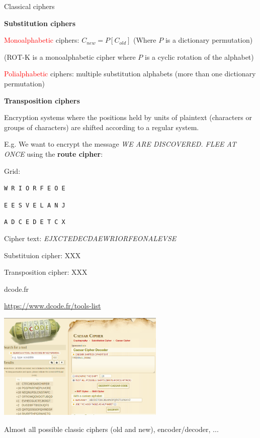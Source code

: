 \begin{frame}{Classical ciphers}

\textbf{Substitution ciphers}

\textcolor{red}{Monoalphabetic} ciphers: $C_{new} = P[C_{old}]$ (Where $P$ is a dictionary permutation)

\smallskip

(ROT-K is a monoalphabetic cipher where $P$ is a cyclic rotation of the alphabet)

\smallskip

\textcolor{red}{Polialphabetic} ciphers: multiple substitution alphabets (more than one dictionary permutation)

\smallskip

\textbf{Transposition ciphers}

Encryption systems where the positions held by units of plaintext (characters or groups of characters) are shifted according to a regular system.

\smallskip

E.g. We want to encrypt the message \textit{WE ARE DISCOVERED. FLEE AT ONCE} using the \textbf{route cipher}:

Grid: 

\centerline{\texttt{W R I O R F E O E}}
\centerline{\texttt{E E S V E L A N J}}
\centerline{\texttt{A D C E D E T C X}}

Cipher text: \textit{EJXCTEDECDAEWRIORFEONALEVSE}

\end{frame}
\begin{frame}{Substituion cipher: XXX}
  
\end{frame}
\begin{frame}{Transposition cipher: XXX}

\end{frame}
\begin{frame}{dcode.fr}

\centering

\href{https://www.dcode.fr/tools-list}{https://www.dcode.fr/tools-list}

\medskip

\includegraphics[width=8cm]{img/dcode.png}

\medskip

Almost all possible classic ciphers (old and new), encoder/decoder, ...

\end{frame}
